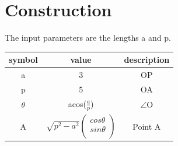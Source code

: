 \documentclass[journal,10pt,twocolumn]{article}
\begin{document}
\section*{Construction}
The input parameters are the lengths a and p.\\
\setlength \extrarowheight{2pt}
\centering
	\begin{tabular}{|c|c|c|}
	\hline
	\textbf{symbol}&\textbf{value}&\textbf{description}\\
	\hline
	a&3&OP\\
	\hline
	p&5&OA\\
	\hline
		$\theta$&acos($\frac{a}{p}$)&$\angle$O\\
	\hline
	A&$\sqrt{p^2-a^2}%
	\begin{pmatrix}
	cos\theta\\
	sin\theta\\
	\end{pmatrix}$%
	&Point A\\
	\hline
\end{tabular}
\end{document}
